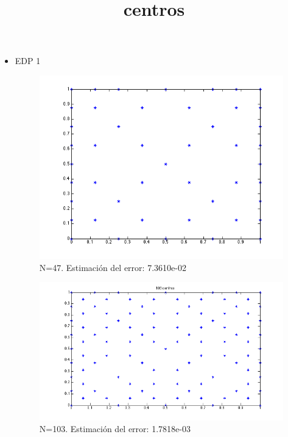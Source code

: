 \documentclass[11pt,a4paper]{article}
\title{centros}
\begin{document}
\begin{itemize}
\item EDP 1
\begin{figure}[H]
\begin{center}
\includegraphics[scale=0.45]{edp1_47.png}
\caption{N=47. Estimación del error: 7.3610e-02}
\end{center}
\end{figure}
\begin{figure}[H]
\begin{center}
\includegraphics[scale=0.45]{edp1_103.png}
\caption{N=103. Estimación del error: 1.7818e-03}
\end{center}
\end{figure}
\begin{figure}[H]
\begin{center}

\end{center}
\end{figure}
\end{itemize}
\end{document}
